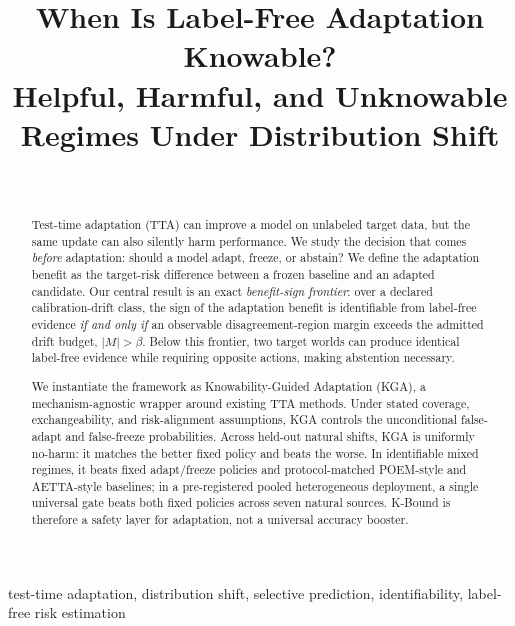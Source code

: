 \documentclass[conference]{IEEEtran}
\title{When Is Label-Free Adaptation Knowable? \\
Helpful, Harmful, and Unknowable Regimes Under Distribution Shift}
\author{\IEEEauthorblockN{Anonymous Author(s)}\\
\IEEEauthorblockA{Affiliation withheld for double-blind review\\}}
\theoremstyle{plain}
\theoremstyle{definition}
\theoremstyle{remark}
\begin{document}
\maketitle

\begin{abstract}
Test-time adaptation (TTA) can improve a model on unlabeled target data, but the same update can also silently harm performance. We study the decision that comes \emph{before} adaptation: should a model adapt, freeze, or abstain? We define the adaptation benefit as the target-risk difference between a frozen baseline and an adapted candidate. Our central result is an exact \emph{benefit-sign frontier}: over a declared calibration-drift class, the sign of the adaptation benefit is identifiable from label-free evidence \emph{if and only if} an observable disagreement-region margin exceeds the admitted drift budget, $|M|>\beta$. Below this frontier, two target worlds can produce identical label-free evidence while requiring opposite actions, making abstention necessary.

We instantiate the framework as Knowability-Guided Adaptation (\textsc{KGA}), a mechanism-agnostic wrapper around existing TTA methods. Under stated coverage, exchangeability, and risk-alignment assumptions, \textsc{KGA} controls the unconditional false-adapt and false-freeze probabilities. Across held-out natural shifts, \textsc{KGA} is uniformly no-harm: it matches the better fixed policy and beats the worse. In identifiable mixed regimes, it beats fixed adapt/freeze policies and protocol-matched POEM-style and AETTA-style baselines; in a pre-registered pooled heterogeneous deployment, a single universal gate beats both fixed policies across seven natural sources. K-Bound is therefore a safety layer for adaptation, not a universal accuracy booster.
\end{abstract}


\begin{IEEEkeywords}
test-time adaptation, distribution shift, selective prediction, identifiability, label-free risk estimation
\end{IEEEkeywords}
\end{document}
